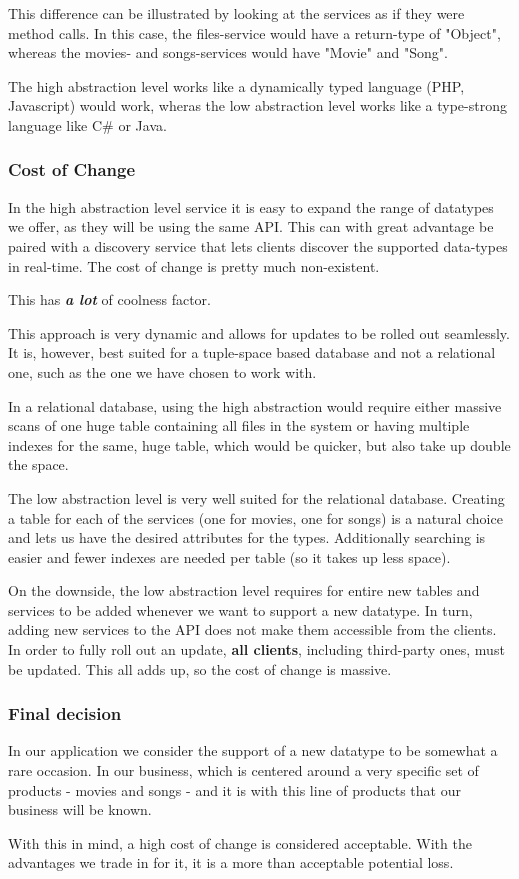 This difference can be illustrated by looking at the services as if they were method calls.
In this case, the files-service would have a return-type of "Object", whereas the movies-
and songs-services would have "Movie" and "Song".

The high abstraction level works like a dynamically typed language (PHP, Javascript) would
work, wheras the low abstraction level works like a type-strong language like C\# or Java.

\subsubsection{Cost of Change}
In the high abstraction level service it is easy to expand the range of datatypes we offer,
as they will be using the same API. This can with great advantage be paired with a discovery
service that lets clients discover the supported data-types in real-time. The cost of change
is pretty much non-existent.

This has \textbf{\emph{a lot}} of coolness factor.

This approach is very dynamic and allows for updates to be rolled out seamlessly. It is, however,
best suited for a tuple-space based database and not a relational one, such as the one we have
chosen to work with.

In a relational database, using the high abstraction would require either massive scans of one
huge table containing all files in the system or having multiple indexes for the same, huge table,
which would be quicker, but also take up double the space.

The low abstraction level is very well suited for the relational database. Creating a table for each
of the services (one for movies, one for songs) is a natural choice and lets us have the desired
attributes for the types. Additionally searching is easier and fewer indexes are needed per table
(so it takes up less space).

On the downside, the low abstraction level requires for entire new tables and services to be added
whenever we want to support a new datatype. In turn, adding new services to the API does not make
them accessible from the clients. In order to fully roll out an update, {\bf all clients},
including third-party ones, must be updated. This all adds up, so the cost of change is massive.

\subsubsection{Final decision}
In our application we consider the support of a new datatype to be somewhat a rare occasion. In our
business, which is centered around a very specific set of products - movies and songs - and it is with
this line of products that our business will be known.

With this in mind, a high cost of change is considered acceptable. With the advantages we trade in for
it, it is a more than acceptable potential loss.